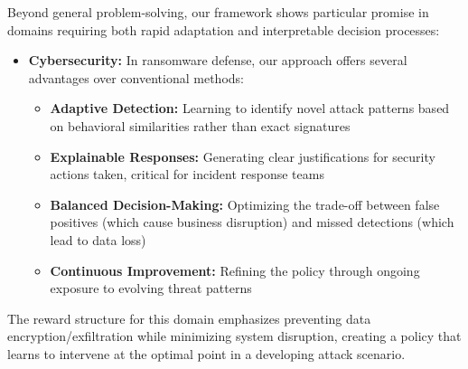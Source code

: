 \documentclass[10pt,journal,compsoc]{IEEEtran}
\begin{document}
Beyond general problem-solving, our framework shows particular promise in domains requiring both rapid adaptation and interpretable decision processes:

\begin{itemize}
\item \textbf{Cybersecurity:} In ransomware defense, our approach offers several advantages over conventional methods:
  \begin{itemize}
  \item \textbf{Adaptive Detection:} Learning to identify novel attack patterns based on behavioral similarities rather than exact signatures
  \item \textbf{Explainable Responses:} Generating clear justifications for security actions taken, critical for incident response teams
  \item \textbf{Balanced Decision-Making:} Optimizing the trade-off between false positives (which cause business disruption) and missed detections (which lead to data loss)
  \item \textbf{Continuous Improvement:} Refining the policy through ongoing exposure to evolving threat patterns
  \end{itemize}
\end{itemize}

The reward structure for this domain emphasizes preventing data encryption/exfiltration while minimizing system disruption, creating a policy that learns to intervene at the optimal point in a developing attack scenario.
\end{document}
